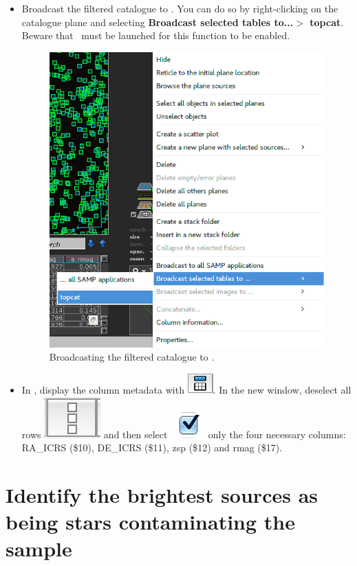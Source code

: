 \documentclass [a4paper, 12pt]{article}
\begin{document}
\begin{itemize}
\item Broadcast the filtered catalogue to \topcat. You can do so by
right-clicking on the catalogue plane and selecting \textbf{Broadcast selected
tables to...$>$ topcat}. Beware that \topcat\ must be launched for this
function to be enabled.

\begin{figure}[H]
\center
\includegraphics[width=0.4 \textwidth]{../images/aladin_send_table_topcat.png}
\caption{Broadcasting the filtered catalogue to \topcat.}
\label{fig:topcatbroadcast}
\end{figure}

\item In \topcat, display the column metadata with \includegraphics[width=0.04
\textwidth]{../images/topcat_button_metadata.jpg}. In the new window, deselect
all rows
\includegraphics[width=0.04  \textwidth]{../images/topcat_button_invisible.jpg}
and then select  \includegraphics[width=0.04
\textwidth]{../images/topcat_button_select.jpg}
only the four necessary columns: RA\_ICRS (\$10), DE\_ICRS (\$11), zsp (\$12)
and rmag (\$17).
\end{itemize}

\section{Identify the brightest sources as being stars contaminating the sample}
\end{document}
